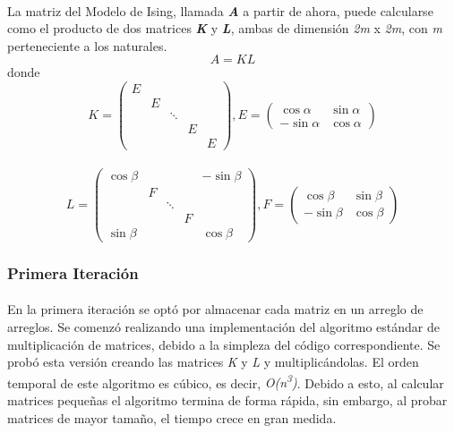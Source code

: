 \documentclass[a4paper,11pt]{article}
\begin{document}
\paragraph{}
La matriz del Modelo de Ising, llamada \textbf{\emph{A}} a partir de ahora, puede calcularse como el producto de dos matrices \textbf{\emph{K}} y \textbf{\emph{L}}, ambas de dimensi\'on \emph{2m} x \emph{2m}, con \emph{m} perteneciente a los naturales.
\begin{equation} \label{matrizA}
A = K L
\end{equation}
donde
\begin{equation} \label{matrizK}
K =
\left( \begin{array}{ccccc}
E &  &  &  & \\
 & E &  &  & \\
 &  & \ddots &  & \\
 &  &  & E & \\
 &  &  &  & E\end{array} \right),	E =
 \left( \begin{array}{cc}
  \cos \alpha & \sin \alpha\\
-\sin \alpha & \cos \alpha\end{array} \right)
\end{equation}
\\
\begin{equation} \label{matrizL}
L =
\left( \begin{array}{ccccc}
\cos \beta &  &  &  & -\sin \beta\\
 & F &  &  & \\
 &  & \ddots &  & \\
 &  &  & F & \\
\sin \beta &  &  &  & \cos \beta\end{array} \right),	F =
 \left( \begin{array}{cc}
  \cos \beta & \sin \beta\\
-\sin \beta & \cos \beta\end{array} \right)
\end{equation}
\subsubsection{Primera Iteraci\'on}
\paragraph{}
En la primera iteraci\'on se opt\'o por almacenar cada matriz en un arreglo de arreglos. Se comenz\'o realizando una implementaci\'on del algoritmo est\'andar de multiplicaci\'on de matrices, debido a la simpleza del c\'odigo correspondiente. Se prob\'o esta versi\'on creando las matrices \emph{K} y \emph{L} y multiplic\'andolas. El orden temporal de este algoritmo es c\'ubico, es decir, \emph{O(n\textsuperscript{3})}. Debido a esto, al calcular matrices pequeñas el algoritmo termina de forma r\'apida, sin embargo, al probar matrices de mayor tamaño, el tiempo crece en gran medida.
\end{document}
